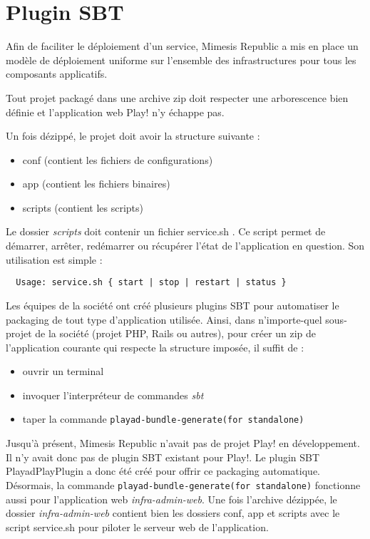 \section{Plugin SBT}

Afin de faciliter le déploiement d'un service, Mimesis Republic a mis en place
un modèle de déploiement uniforme sur l'ensemble des infrastructures pour tous
les composants applicatifs.

Tout projet packagé dans une archive zip doit respecter une arborescence bien
définie et l'application web Play! n'y échappe pas.

Un fois dézippé, le projet doit avoir la structure suivante :
\begin{itemize}
\item[\textbullet] conf    (contient les fichiers de configurations)
\item[\textbullet] app     (contient les fichiers binaires)
\item[\textbullet] scripts (contient les scripts)
\end{itemize}

Le dossier \textit{scripts} doit contenir un fichier service.sh .
Ce script permet de démarrer, arrêter, redémarrer ou récupérer l'état de
l'application en question.
Son utilisation est simple :
\begin{lstlisting}
  Usage: service.sh { start | stop | restart | status }  
\end{lstlisting}

Les équipes de la société ont créé plusieurs plugins SBT pour automatiser le
packaging de tout type d'application utilisée.
Ainsi, dans n'importe-quel sous-projet de la société (projet PHP, Rails ou
autres), pour créer un zip de l'application courante qui respecte la
structure imposée, il suffit de :
\begin{itemize}
\item ouvrir un terminal
\item invoquer l'interpréteur de commandes \textit{sbt}
\item taper la commande \verb?playad-bundle-generate(for standalone)? \\
\end{itemize}

Jusqu'à présent, Mimesis Republic n'avait pas de projet Play! en développement.
Il n'y avait donc pas de plugin SBT existant pour Play!. 
Le plugin SBT PlayadPlayPlugin a donc été créé pour offrir ce packaging 
automatique.
Désormais, la commande \verb?playad-bundle-generate(for standalone)? fonctionne
aussi pour l'application web \textit{infra-admin-web}.
Une fois l'archive dézippée, le dossier \textit{infra-admin-web} contient bien
les dossiers conf, app et scripts avec le script service.sh pour piloter le
serveur web de l'application.

